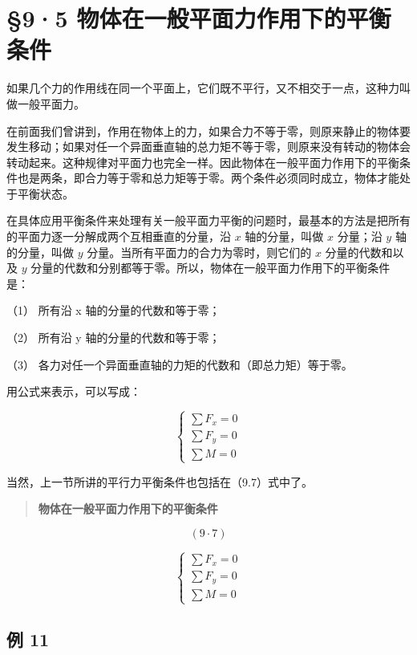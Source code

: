 \section{§9·5
物体在一般平面力作用下的平衡条件}\label{ux7269ux4f53ux5728ux4e00ux822cux5e73ux9762ux529bux4f5cux7528ux4e0bux7684ux5e73ux8861ux6761ux4ef6}

如果几个力的作用线在同一个平面上，它们既不平行，又不相交于一点，这种力叫做一般平面力。

在前面我们曾讲到，作用在物体上的力，如果合力不等于零，则原来静止的物体要发生移动；如果对任一个异面垂直轴的总力矩不等于零，则原来没有转动的物体会转动起来。这种规律对平面力也完全一样。因此物体在一般平面力作用下的平衡条件也是两条，即合力等于零和总力矩等于零。两个条件必须同时成立，物体才能处于平衡状态。

在具体应用平衡条件来处理有关一般平面力平衡的问题时，最基本的方法是把所有的平面力逐一分解成两个互相垂直的分量，沿
\(x\) 轴的分量，叫做 \(x\) 分量；沿 \(y\) 轴的分量，叫做 \(y\)
分量。当所有平面力的合力为零时，则它们的 \(x\) 分量的代数和以及 \(y\)
分量的代数和分别都等于零。所以，物体在一般平面力作用下的平衡条件是：

（1） 所有沿 x 轴的分量的代数和等于零；

（2） 所有沿 y 轴的分量的代数和等于零；

（3） 各力对任一个异面垂直轴的力矩的代数和（即总力矩）等于零。

用公式来表示，可以写成：

\[
\left\{ \begin{array}{l} \sum F _ {x} = 0 \\ \sum F _ {y} = 0 \\ \sum M = 0 \end{array} \right. \tag {9.7}
\]

当然，上一节所讲的平行力平衡条件也包括在（9.7）式中了。

\begin{quote}
\textbf{物体在一般平面力作用下的平衡条件}
\end{quote}

\[
(9 \cdot 7)
\]

\[
\left\{ \begin{array}{l} \sum F _ {x} = 0 \\ \sum F _ {y} = 0 \\ \sum M = 0 \end{array} \right.
\]

\subsection{例 11}\label{ux4f8b-11-2}

